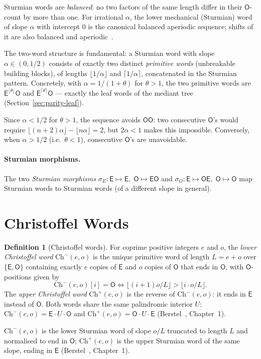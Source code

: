 \documentclass[12pt]{article}
\theoremstyle{definition}
\newtheorem{definition}[theorem]{Definition}
\theoremstyle{remark}
\theoremstyle{plain}
\newcommand{\OO}{\mathsf{O}}
\newcommand{\EE}{\mathsf{E}}
\begin{document}
Sturmian words are \emph{balanced}: no two factors of the same length differ in
their $\OO$-count by more than one.
For irrational $\alpha$, the lower mechanical (Sturmian) word of slope $\alpha$ with
intercept $0$ is the canonical balanced aperiodic sequence; shifts of it are also balanced
and aperiodic~\cite{morse1940}.

The two-word structure is fundamental: a Sturmian word with slope
$\alpha \in (0, 1/2)$ consists of exactly two distinct \emph{primitive words}
(unbreakable building blocks), of lengths $\lfloor 1/\alpha \rfloor$ and
$\lceil 1/\alpha \rceil$, concatenated in the Sturmian pattern.
Concretely, with $\alpha = 1/(1+\theta)$ for $\theta > 1$, the two primitive words
are $\EE^{\lfloor\theta\rfloor}\OO$ and $\EE^{\lceil\theta\rceil}\OO$ --- exactly
the leaf words of the mediant tree (Section~\ref{sec:parity-leaf}).

Since $\alpha < 1/2$ for $\theta > 1$, the sequence avoids $\OO\OO$: two consecutive
$\OO$'s would require $\lfloor(n+2)\alpha\rfloor - \lfloor n\alpha\rfloor = 2$, but
$2\alpha < 1$ makes this impossible.
Conversely, when $\alpha > 1/2$ (i.e.\ $\theta < 1$), consecutive $\OO$'s are
unavoidable.

\paragraph{Sturmian morphisms.}
The two \emph{Sturmian morphisms}
$\sigma_E\colon \EE \mapsto \EE,\; \OO \mapsto \EE\OO$ and
$\sigma_O\colon \EE \mapsto \OO\EE,\; \OO \mapsto \OO$
map Sturmian words to Sturmian words (of a different slope in general).

\section{Christoffel Words}
\label{sec:background-deluca}

\begin{definition}[Christoffel words]
\label{def:christoffel}
For coprime positive integers $e$ and $o$, the \emph{lower Christoffel word}
$\mathrm{Ch}^-(e, o)$ is the unique primitive word of length $L = e + o$ over $\{\EE, \OO\}$
containing exactly $e$ copies of $\EE$ and $o$ copies of $\OO$ that ends in $\OO$,
with $\OO$-positions given by
\[
  \mathrm{Ch}^-(e, o)[i] = \OO \iff \lfloor (i+1)o/L \rfloor > \lfloor i \cdot o / L \rfloor.
\]
The \emph{upper Christoffel word} $\mathrm{Ch}^+(e, o)$ is the reverse of
$\mathrm{Ch}^-(e, o)$: it ends in $\EE$ instead of $\OO$.
Both words share the same palindromic interior $U$: $\mathrm{Ch}^-(e,o) = \EE \cdot U \cdot \OO$
and $\mathrm{Ch}^+(e,o) = \OO \cdot U \cdot \EE$
(Berstel~\cite{berstel2009}, Chapter~1).

$\mathrm{Ch}^-(e, o)$ is the lower Sturmian word of slope $o/L$ truncated to length $L$
and normalised to end in $\OO$; $\mathrm{Ch}^+(e, o)$ is the upper Sturmian word of the
same slope, ending in $\EE$ (Berstel~\cite{berstel2009}, Chapter~1).
\end{definition}
\end{document}
